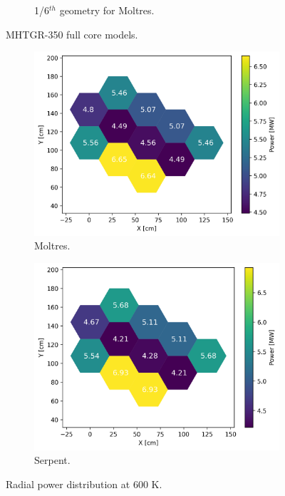 \documentclass[11pt,letterpaper]{article}
\begin{document}
\begin{figure}[htbp!]
\begin{subfigure}[t]{0.4\textwidth}
		\caption{1/6$^{th}$ geometry for Moltres.}
	\end{subfigure}
	\hfill
	\caption{MHTGR-350 full core models.}
	\label{fig:fullcoremodel}
\end{figure}

\begin{figure}[htbp!]
	\centering
	\begin{subfigure}[t]{0.4\textwidth}
		\centering
		\includegraphics[width=\linewidth]{figures-fullcore/serpent26G-600-power}
		\caption{Moltres.}
	\end{subfigure}
	\begin{subfigure}[t]{0.4\textwidth}
		\centering
		\includegraphics[width=\linewidth]{figures-fullcore/3D-fullcore-600-15Gd-power}
		\caption{Serpent.}
	\end{subfigure}
	\hfill
	\caption{Radial power distribution at 600 K.}
	\label{fig:fullcore-power}
\end{figure}
\end{document}
